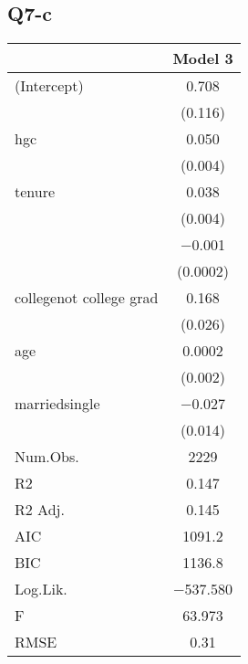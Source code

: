 \documentclass{article}
\begin{document}
\subsection*{Q7-c}
\begin{table}[h]
\centering
\begin{tabular}[t]{lc}
\hline
  & Model 3\\
\hline
(Intercept) & \num{0.708}\\
 & (\num{0.116})\\
hgc & \num{0.050}\\
 & \vphantom{1} (\num{0.004})\\
tenure & \num{0.038}\\
 & (\num{0.004})\\
 & \num{-0.001}\\
 & (\num{0.0002})\\
collegenot college grad & \num{0.168}\\
 & (\num{0.026})\\
age & \num{0.0002}\\
 & (\num{0.002})\\
marriedsingle & \num{-0.027}\\
 & (\num{0.014})\\
\hline
Num.Obs. & \num{2229}\\
R2 & \num{0.147}\\
R2 Adj. & \num{0.145}\\
AIC & \num{1091.2}\\
BIC & \num{1136.8}\\
Log.Lik. & \num{-537.580}\\
F & \num{63.973}\\
RMSE & \num{0.31}\\
\hline
\end{tabular}
\end{table}
\end{document}
